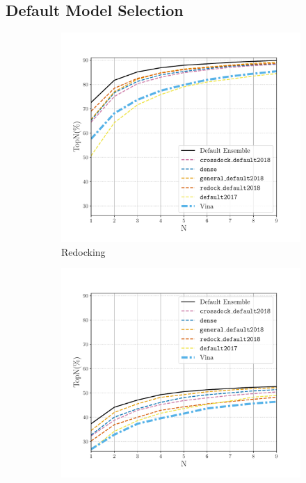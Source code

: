 \documentclass[journal=jcisd8,manuscript=article]{achemso}
\begin{document}
\subsection{Default Model Selection}
\begin{figure}
	\begin{subfigure}[b]{0.48\textwidth}
		\centering
		\includegraphics[width=\textwidth]{figures/redocking/rescore_single_models_line.pdf}
		\caption{Redocking}
		\label{fig:RescoreSingleRedock}
        \end{subfigure}    
	\begin{subfigure}[b]{0.48\textwidth}    
		\centering
		\includegraphics[width=\textwidth]{figures/crossdocking/rescore_single_models_line.pdf}

\end{subfigure}
\end{figure}
\end{document}
